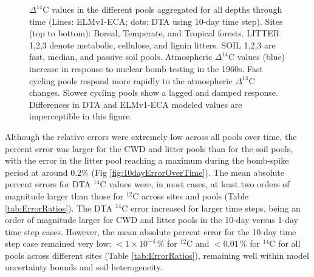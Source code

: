 \documentclass[draft]{agujournal2019}
\begin{document}
\begin{figure}[htbp]
        \vspace{-4em}
        \caption{$\Delta^{14}$C values in the different pools aggregated for all depths through time (Lines: ELMv1-ECA; dots: DTA using 10-day time step). Sites (top to bottom): Boreal, Temperate, and Tropical forests. LITTER 1,2,3 denote metabolic, cellulose, and lignin litters. SOIL 1,2,3 are fast, median, and passive soil pools. Atmospheric $\Delta^{14}$C values (blue) increase in response to nuclear bomb testing in the 1960s. Fast cycling pools respond more rapidly to the atmospheric $\Delta^{14}$C changes. Slower cycling pools show a lagged and damped response. Differences in DTA and ELMv1-ECA modeled values are imperceptible in this figure.
        \label{fig:poolsOverTime}
        }
    \end{figure}    



Although the relative errors were extremely low across all pools over time, the percent error was larger for the CWD and litter pools than for the soil pools, with the error in the litter pool reaching a maximum during the  bomb-spike period at around 0.2\% (Fig \ref{fig:10dayErrorOverTime}). The mean absolute percent errors for DTA $^{14}$C values were, in most cases, at least two orders of magnitude larger than those for $^{12}$C across sites and pools (Table \ref{tab:ErrorRatios}). The DTA $^{14}$C error increased for larger time steps, being an order of magnitude larger for CWD and litter pools in the 10-day versus 1-day time step cases. However, the mean absolute percent error for the 10-day time step case remained very low: $< 1 \times 10^{-4}\,\%$ for $^{12}$C and $<0.01\,\%$ for $^{14}$C for all pools across different sites (Table \ref{tab:ErrorRatios}), remaining well within model uncertainty bounds and soil heterogeneity.
\end{document}
